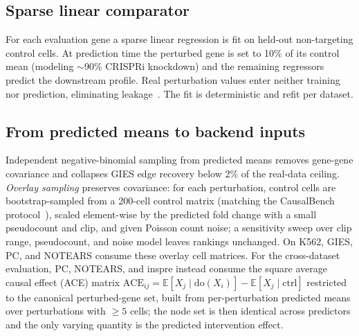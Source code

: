 \documentclass{article}
\theoremstyle{plain}
\theoremstyle{definition}
\theoremstyle{remark}
\begin{document}
\subsection{Sparse linear comparator}
For each evaluation gene a sparse linear regression is fit on held-out non-targeting control cells. At prediction time the perturbed gene is set to 10\% of its control mean (modeling $\sim$90\% CRISPRi knockdown) and the remaining regressors predict the downstream profile. Real perturbation values enter neither training nor prediction, eliminating leakage~\citep{zou2005elasticnet}. The fit is deterministic and refit per dataset.

\subsection{From predicted means to backend inputs}
\label{sec:means-to-backend}
Independent negative-binomial sampling from predicted means removes gene-gene covariance and collapses GIES edge recovery below 2\% of the real-data ceiling. \emph{Overlay sampling} preserves covariance: for each perturbation, control cells are bootstrap-sampled from a 200-cell control matrix (matching the CausalBench protocol~\citep{chevalley2025causalbench}), scaled element-wise by the predicted fold change with a small pseudocount and clip, and given Poisson count noise; a sensitivity sweep over clip range, pseudocount, and noise model leaves rankings unchanged. On K562, GIES, PC, and NOTEARS consume these overlay cell matrices. For the cross-dataset evaluation, PC, NOTEARS, and inspre instead consume the square average causal effect (ACE) matrix $\mathrm{ACE}_{ij}=\mathbb{E}[X_j\mid\mathrm{do}(X_i)]-\mathbb{E}[X_j\mid\mathrm{ctrl}]$ restricted to the canonical perturbed-gene set, built from per-perturbation predicted means over perturbations with $\geq 5$ cells; the node set is then identical across predictors and the only varying quantity is the predicted intervention effect.
\end{document}
